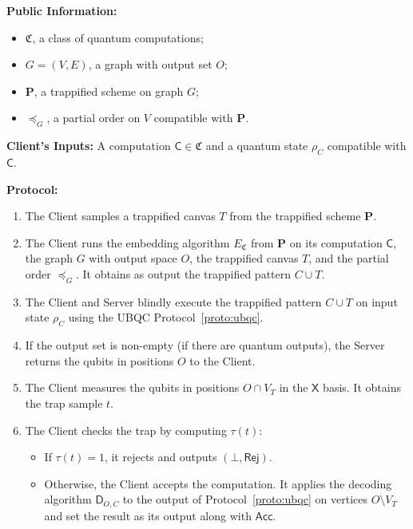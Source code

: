 \documentclass[12pt]{iopart}
\newcommand{\cptp}[1]{\mathsf{#1}} \newcommand{\pd}[1]{\mathcal{#1}}  \newcommand{\sch}[1]{\bm{#1}}
\newcommand{\X}{\cptp{X}}
\renewcommand{\1}{\mathds{1}}
\newcommand{\acc}{\mathsf{Acc}}
\newcommand{\rej}{\mathsf{Rej}}
\newcommand{\TP}{C\cup T}
\newcommand{\Deco}{\cptp D_{O, C}}
\begin{document}
\begin{protocol}[ht]
  \caption{Trappified Delegated Blind Computation}
  \label{proto:dev_detect}
  \begin{algorithmic}[0]
  
    \STATE \textbf{Public Information:} 
	\begin{itemize}
		\item $\mathfrak{C}$, a class of quantum computations;
		\item $G = (V, E)$, a graph with output set $O$;
		\item $\sch P$, a trappified scheme on graph $G$;
		\item $\preceq_G$, a partial order on $V$ compatible with $\sch P$.
	\end{itemize}
    
    \STATE \textbf{Client's Inputs:} A computation $\cptp C \in \mathfrak{C}$ and a quantum state $\rho_C$ compatible with $\cptp C$.
    
    \STATE \textbf{Protocol:}
    \begin{enumerate}
    	\item The Client samples a trappified canvas $T$ from the trappified scheme $\sch P$.
	    \item The Client runs the embedding algorithm $E_{\mathfrak{C}}$ from $\sch P$ on its computation $\cptp C$, the graph $G$ with output space $O$, the trappified canvas $T$, and the partial order $\preceq_G$. It obtains as output the trappified pattern $\TP$.
	    \item The Client and Server blindly execute the trappified pattern $\TP$ on input state $\rho_C$ using the UBQC Protocol~\ref{proto:ubqc}.
	    \item If the output set is non-empty (if there are quantum outputs), the Server returns the qubits in positions $O$ to the Client.
	    \item The Client measures the qubits in positions $O \cap V_T$ in the $\X$ basis. It obtains the trap sample $t$.
	    \item The Client checks the trap by computing $\tau(t)$:
	    \begin{itemize}
	    	\item If $\tau(t) = 1$, it rejects and outputs $(\bot, \rej)$.
	    	\item Otherwise, the Client accepts the computation. It applies the decoding algorithm $\Deco$ to the output of Protocol~\ref{proto:ubqc} on vertices $O \setminus V_T$ and set the result as its output along with $\acc$.
		\end{itemize}	    
    \end{enumerate}
    
  \end{algorithmic}
\end{protocol}
\end{document}
